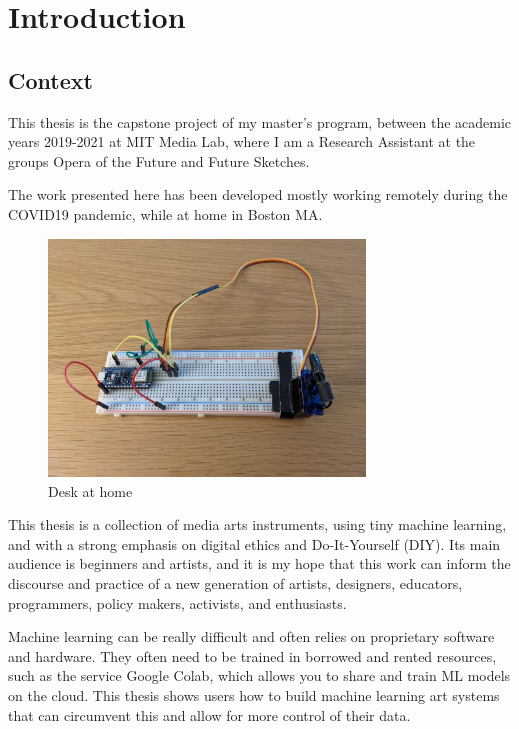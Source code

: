 \chapter{Introduction}

\section{Context}

This thesis is the capstone project of my master's program, between the academic years 2019-2021 at MIT Media Lab, where I am a Research Assistant at the groups Opera of the Future and Future Sketches.

The work presented here has been developed mostly working remotely during the COVID19 pandemic, while at home in Boston MA.

\begin{figure}[h]
	\centering
	\includegraphics[width=0.75\textwidth]{images/desk.jpg}
	\caption{Desk at home}
	\label{fig:desk}
\end{figure}

This thesis is a collection of media arts instruments, using tiny machine learning, and with a strong emphasis on digital ethics and Do-It-Yourself (DIY). Its main audience is beginners and artists, and it is my hope that this work can inform the discourse and practice of a new generation of artists,  designers, educators, programmers, policy makers, activists, and enthusiasts.

Machine learning can be really difficult and often relies on proprietary software and hardware. They often need to be trained in borrowed and rented resources, such as the service Google Colab, which allows you to share and train ML models on the cloud. This thesis shows users how to build machine learning art systems that can circumvent this and allow for more control of their data.

